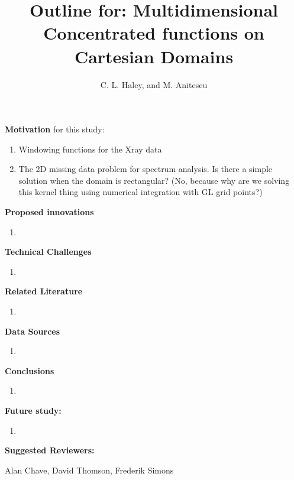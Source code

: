 \documentclass{article}
\title{Outline for: Multidimensional Concentrated functions on Cartesian Domains}
\author{C. L. Haley, and M. Anitescu}
\begin{document}
\maketitle

\textbf{Motivation} for this study:

\begin{enumerate}
  
  \item Windowing functions for the Xray data

  \item The 2D missing data problem for spectrum analysis. Is there a simple solution
when the domain is rectangular? (No, because why are we solving this kernel thing
using numerical integration with GL grid points?) 

\end{enumerate}

\textbf{Proposed innovations}

\begin{enumerate}

  \item 

\end{enumerate}

\textbf{Technical Challenges}

\begin{enumerate}

  \item 

\end{enumerate}

\textbf{Related Literature}

\begin{enumerate}

  \item 

\end{enumerate}

\textbf{Data Sources}

\begin{enumerate}

  \item 

\end{enumerate}

\textbf{Conclusions}

\begin{enumerate}

  \item 

\end{enumerate}


\textbf{Future study:} 

\begin{enumerate} 

  \item 

\end{enumerate}

\textbf{Suggested Reviewers:}

Alan Chave, David Thomson, Frederik Simons 



\end{document}
